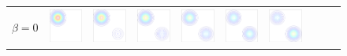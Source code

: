 \newcommand{\sidecap}[1]{ {\begin{sideways}\parbox{1.6cm}{\centering #1}\end{sideways}} }
\begin{figure}[!ht]
\begin{center}
\begin{tabular}{cccccccccc}
\sidecap{$\beta=0$ } &\hspace{-0.45cm}
\includegraphics[width=1.6cm]{images/bump_beta/bump_beta_0_iso_01}&
\hspace{-0.45cm}\includegraphics[width=1.6cm]{images/bump_beta/bump_beta_0_iso_05}&
\hspace{-0.45cm}\includegraphics[width=1.6cm]{images/bump_beta/bump_beta_0_iso_09}&
\hspace{-0.45cm}\includegraphics[width=1.6cm]{images/bump_beta/bump_beta_0_iso_13}&
\hspace{-0.45cm}\includegraphics[width=1.6cm]{images/bump_beta/bump_beta_0_iso_17}&
\hspace{-0.45cm}\includegraphics[width=1.6cm]{images/bump_beta/bump_beta_0_iso_21}&

\end{tabular}
\end{center}
\end{figure}
